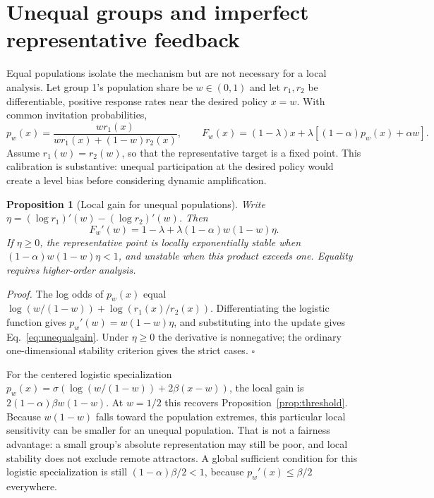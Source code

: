 \documentclass{article}
\newtheorem{proposition}{Proposition}
\begin{document}
\section{Unequal groups and imperfect representative feedback}\label{sec:extensions}
Equal populations isolate the mechanism but are not necessary for a local analysis. Let group 1's population share be $w\in(0,1)$ and let $r_1,r_2$ be differentiable, positive response rates near the desired policy $x=w$. With common invitation probabilities,
\begin{equation}
p_w(x)=\frac{wr_1(x)}{wr_1(x)+(1-w)r_2(x)},\qquad
F_w(x)=(1-\lambda)x+\lambda[(1-\alpha)p_w(x)+\alpha w].
\label{eq:unequal}
\end{equation}
Assume $r_1(w)=r_2(w)$, so that the representative target is a fixed point. This calibration is substantive: unequal participation at the desired policy would create a level bias before considering dynamic amplification.

\begin{proposition}[Local gain for unequal populations]\label{prop:unequal}
Write $\eta=(\log r_1)'(w)-(\log r_2)'(w)$. Then
\begin{equation}
F_w'(w)=1-\lambda+\lambda(1-\alpha)w(1-w)\eta.
\label{eq:unequalgain}
\end{equation}
If $\eta\ge0$, the representative point is locally exponentially stable when $(1-\alpha)w(1-w)\eta<1$, and unstable when this product exceeds one. Equality requires higher-order analysis.
\end{proposition}
\emph{Proof.} The log odds of $p_w(x)$ equal $\log(w/(1-w))+\log(r_1(x)/r_2(x))$. Differentiating the logistic function gives $p_w'(w)=w(1-w)\eta$, and substituting into the update gives Eq.~\eqref{eq:unequalgain}. Under $\eta\ge0$ the derivative is nonnegative; the ordinary one-dimensional stability criterion gives the strict cases. $\square$

For the centered logistic specialization $p_w(x)=\sigma(\log(w/(1-w))+2\beta(x-w))$, the local gain is $2(1-\alpha)\beta w(1-w)$. At $w=1/2$ this recovers Proposition~\ref{prop:threshold}. Because $w(1-w)$ falls toward the population extremes, this particular local sensitivity can be smaller for an unequal population. That is not a fairness advantage: a small group's absolute representation may still be poor, and local stability does not exclude remote attractors. A global sufficient condition for this logistic specialization is still $(1-\alpha)\beta/2<1$, because $p_w'(x)\le\beta/2$ everywhere.
\end{document}
